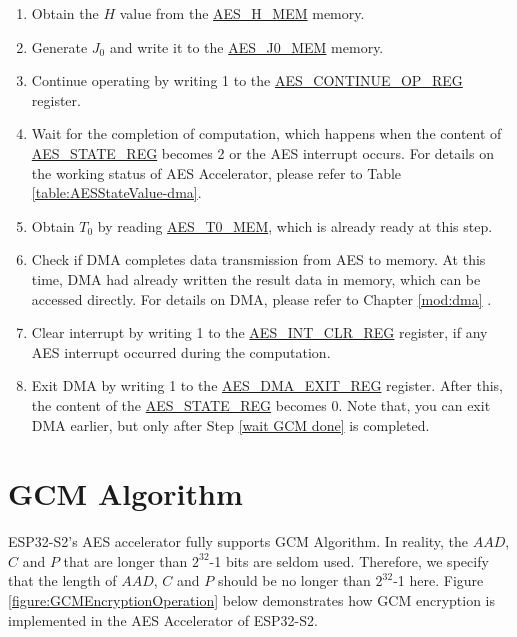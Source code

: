 \documentclass[main\_\_EN.tex]{subfiles}
\begin{document}
\begin{enumerate}
    \item Obtain the $H$ value from the \hyperref[memdesc:AESHMEM]{AES\_H\_MEM} memory.
    \item Generate $J_0$ and write it to the \hyperref[memdesc:AESJ0MEM]{AES\_J0\_MEM} memory.
    \item Continue operating by writing 1 to the \hyperref[regdesc:AESCONTINUEOPREG]{AES\_CONTINUE\_OP\_REG} register.
    \item \label{wait GCM done}
            Wait for the completion of computation, which happens when the content of \hyperref[regdesc:AESSTATEREG]{AES\_STATE\_REG} becomes 2 or the AES interrupt occurs. For details on the working status of AES Accelerator, please refer to Table  \ref{table:AESStateValue-dma}.
    \item Obtain $T_0$ by reading \hyperref[memdesc:AEST0MEM]{AES\_T0\_MEM}, which is already ready at this step.
    \item Check if DMA completes data transmission from AES to memory. At this time, DMA had already written the result data in memory, which can be accessed directly. For details on DMA, please refer to Chapter \ref{mod:dma} \textit{}.
    \item Clear interrupt by writing 1 to the \hyperref[regdesc:AESINTCLRREG]{AES\_INT\_CLR\_REG} register, if any AES interrupt occurred during the computation.
    \item Exit DMA by writing 1 to the \hyperref[regdesc:AESDMAEXITREG]{AES\_DMA\_EXIT\_REG} register. After this, the content of the \hyperref[regdesc:AESSTATEREG]{AES\_STATE\_REG} becomes 0. Note that, you can exit DMA earlier, but only after Step \ref{wait GCM done} is completed.
\end{enumerate}


\section{GCM Algorithm}\label{Label GCM algorithm}

ESP32-S2's AES accelerator fully supports GCM Algorithm. In reality, the \begin{math}AAD\end{math}, \begin{math}C\end{math} and \begin{math}P\end{math} that are longer than \begin{math}2^{32}\end{math}-1 bits are seldom used. Therefore, we specify that the length of \begin{math}AAD\end{math}, \begin{math}C\end{math} and \begin{math}P\end{math} should be no longer than \begin{math}2^{32}\end{math}-1 here.
Figure \ref{figure:GCMEncryptionOperation} below demonstrates how GCM encryption is implemented in the AES Accelerator of ESP32-S2.
\end{document}
